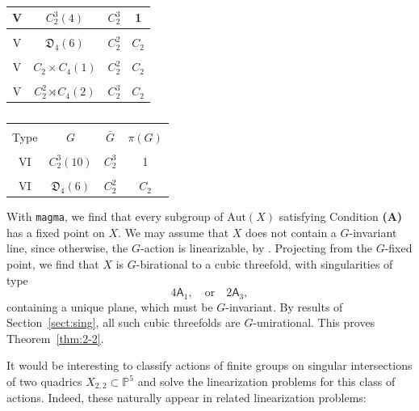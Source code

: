 \documentclass[12pt,reqno]{amsart}
\theoremstyle{plain}
\theoremstyle{remark}
\theoremstyle{definition}
\numberwithin{equation}{section}
\def\fD{{\mathfrak D}}
\def\bP{{\mathbb P}}
\def\Aut{\mathrm{Aut}}
\begin{document}
\begin{table}[H]
\begin{minipage}[t]{0.48\textwidth}
\begin{tabular}{|c|c|c|c|}
V&$C_2^3(4)$&$C_2^3$&1\\\hline&&&\\[-0.4cm]

V&$\fD_4(6)$&$C_2^2$&$C_2$\\\hline &&&\\[-0.4cm]

V&$C_2\times C_4(1)$&$C_2^2$&$C_2$\\\hline&&&\\[-0.4cm]

V&$C_2^2\rtimes C_4(2)$&$C_2^3$&$C_2$\\\hline
\end{tabular}
\end{minipage}
\hfill
\begin{minipage}[t]{0.48\textwidth}
\centering
\begin{tabular}{|c|c|c|c|}
\hline&&&\\[-0.4cm]
Type& $G$ & $\bar G$&$\pi(G)$\\
\hline &&&\\[-0.4cm]

VI&$C_2^3(10)$&$C_2^3$&1\\\hline&&&\\[-0.4cm]

VI&$\fD_4(6)$&$C_2^2$&$C_2$\\\hline
\end{tabular}
\end{minipage}

\vskip 0.2cm
\caption{}
\label{table:list}
\end{table}

With {\tt magma}, we find that every subgroup of $\Aut(X)$ satisfying Condition {\bf (A)} has a fixed point on $X$. We may assume that $X$ does not contain a $G$-invariant line, since otherwise, the $G$-action is 
linearizable, by \cite[Theorem 24]{HT-2quad}.  
Projecting from the $G$-fixed point, we find that $X$ is $G$-birational to a cubic threefold, with singularities of type
$$
4\mathsf A_1, \quad \text{or}\quad 2\mathsf A_3,
$$
containing a unique plane, which must be $G$-invariant.  By results of Section~\ref{sect:sing}, all such cubic threefolds are $G$-unirational.
This proves Theorem~\ref{thm:2-2}.

It would be interesting to classify actions of finite groups on singular intersections of two quadrics $X_{2,2}\subset \bP^5$ and solve the linearization problems for this class of actions. Indeed, these naturally appear in related linearization problems: 
\end{document}
